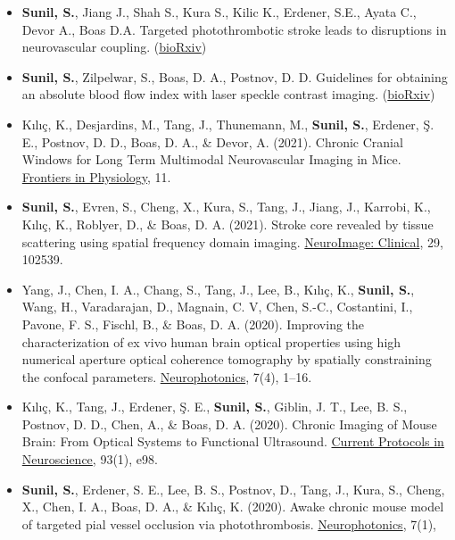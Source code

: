 \documentclass[
  letterpaper,
  DIV=11,
  numbers=noendperiod]{scrartcl}
\providecommand{\tightlist}{%
  \setlength{\itemsep}{0pt}\setlength{\parskip}{0pt}}\usepackage{longtable,booktabs,array}
\begin{document}
\begin{itemize}
\tightlist
\item
  \textbf{Sunil, S.}, Jiang J., Shah S., Kura S., Kilic K., Erdener,
  S.E., Ayata C., Devor A., Boas D.A. Targeted photothrombotic stroke
  leads to disruptions in neurovascular coupling.
  (\href{https://www.biorxiv.org/content/10.1101/2022.01.22.477341v1}{bioRxiv})
\item
  \textbf{Sunil, S.}, Zilpelwar, S., Boas, D. A., Postnov, D. D.
  Guidelines for obtaining an absolute blood flow index with laser
  speckle contrast imaging.
  (\href{https://www.biorxiv.org/content/10.1101/2021.04.02.438198v1}{bioRxiv})
\item
  Kılıç, K., Desjardins, M., Tang, J., Thunemann, M., \textbf{Sunil,
  S.}, Erdener, Ş. E., Postnov, D. D., Boas, D. A., \& Devor, A. (2021).
  Chronic Cranial Windows for Long Term Multimodal Neurovascular Imaging
  in Mice. \href{https://doi.org/10.3389/fphys.2020.612678}{Frontiers in
  Physiology}, 11.
\item
  \textbf{Sunil, S.}, Evren, S., Cheng, X., Kura, S., Tang, J., Jiang,
  J., Karrobi, K., Kılıç, K., Roblyer, D., \& Boas, D. A. (2021). Stroke
  core revealed by tissue scattering using spatial frequency domain
  imaging. \href{https://doi.org/10.1016/j.nicl.2020.102539}{NeuroImage:
  Clinical}, 29, 102539.
\item
  Yang, J., Chen, I. A., Chang, S., Tang, J., Lee, B., Kılıç, K.,
  \textbf{Sunil, S.}, Wang, H., Varadarajan, D., Magnain, C. V, Chen,
  S.-C., Costantini, I., Pavone, F. S., Fischl, B., \& Boas, D. A.
  (2020). Improving the characterization of ex vivo human brain optical
  properties using high numerical aperture optical coherence tomography
  by spatially constraining the confocal parameters.
  \href{https://doi.org/10.1117/1.NPh.7.4.045005}{Neurophotonics}, 7(4),
  1--16.
\item
  Kılıç, K., Tang, J., Erdener, Ş. E., \textbf{Sunil, S.}, Giblin, J.
  T., Lee, B. S., Postnov, D. D., Chen, A., \& Boas, D. A. (2020).
  Chronic Imaging of Mouse Brain: From Optical Systems to Functional
  Ultrasound. \href{https://doi.org/10.1002/cpns.98}{Current Protocols
  in Neuroscience}, 93(1), e98.
\item
  \textbf{Sunil, S.}, Erdener, S. E., Lee, B. S., Postnov, D., Tang, J.,
  Kura, S., Cheng, X., Chen, I. A., Boas, D. A., \& Kılıç, K. (2020).
  Awake chronic mouse model of targeted pial vessel occlusion via
  photothrombosis.
  \href{https://doi.org/10.1117/1.NPh.7.1.015005}{Neurophotonics}, 7(1),

\end{itemize}
\end{document}
